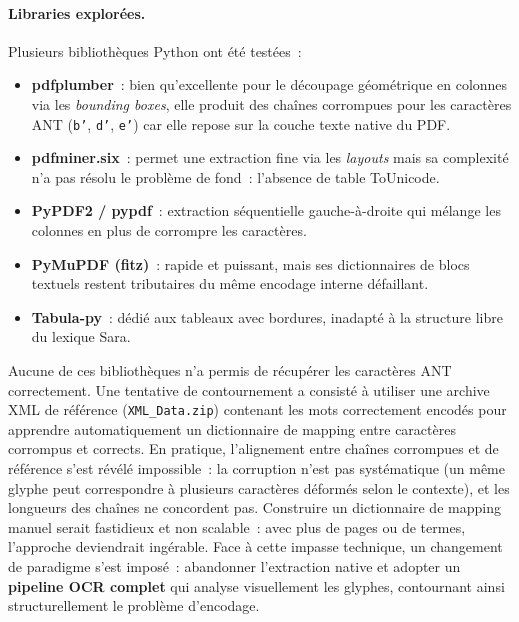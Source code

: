 \documentclass[11pt, a4paper, oneside]{article}
\begin{document}
\paragraph{Libraries explorées.} Plusieurs bibliothèques Python ont été testées~:
\begin{itemize}[noitemsep]
  \item \textbf{pdfplumber}~: bien qu'excellente pour le découpage géométrique en colonnes via les \emph{bounding boxes}, elle produit des chaînes corrompues pour les caractères ANT (\texttt{b'}, \texttt{d'}, \texttt{e'}) car elle repose sur la couche texte native du PDF.
  \item \textbf{pdfminer.six}~: permet une extraction fine via les \emph{layouts} mais sa complexité n'a pas résolu le problème de fond~: l'absence de table ToUnicode.
  \item \textbf{PyPDF2 / pypdf}~: extraction séquentielle gauche-à-droite qui mélange les colonnes en plus de corrompre les caractères.
  \item \textbf{PyMuPDF (fitz)}~: rapide et puissant, mais ses dictionnaires de blocs textuels restent tributaires du même encodage interne défaillant.
  \item \textbf{Tabula-py}~: dédié aux tableaux avec bordures, inadapté à la structure libre du lexique Sara.
\end{itemize}
Aucune de ces bibliothèques n'a permis de récupérer les caractères ANT correctement. Une tentative de contournement a consisté à utiliser une archive XML de référence (\texttt{XML\_Data.zip}) contenant les mots correctement encodés pour apprendre automatiquement un dictionnaire de mapping entre caractères corrompus et corrects. En pratique, l'alignement entre chaînes corrompues et de référence s'est révélé impossible~: la corruption n'est pas systématique (un même glyphe peut correspondre à plusieurs caractères déformés selon le contexte), et les longueurs des chaînes ne concordent pas. Construire un dictionnaire de mapping manuel serait fastidieux et non scalable~: avec plus de pages ou de termes, l'approche deviendrait ingérable. Face à cette impasse technique, un changement de paradigme s'est imposé~: abandonner l'extraction native et adopter un \textbf{pipeline OCR complet} qui analyse visuellement les glyphes, contournant ainsi structurellement le problème d'encodage.
\end{document}
